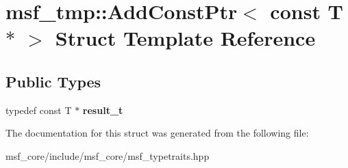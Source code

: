 \hypertarget{structmsf__tmp_1_1AddConstPtr_3_01const_01T_01_5_01_4}{\section{msf\-\_\-tmp\-:\-:Add\-Const\-Ptr$<$ const T $\ast$ $>$ Struct Template Reference}
\label{structmsf__tmp_1_1AddConstPtr_3_01const_01T_01_5_01_4}
}
\subsection*{Public Types}
\begin{DoxyCompactItemize}
\item 
\hypertarget{structmsf__tmp_1_1AddConstPtr_3_01const_01T_01_5_01_4_a8f8af888c4ff5b522236b9cec4b3b2f6}{typedef const T $\ast$ {\bfseries result\-\_\-t}}\label{structmsf__tmp_1_1AddConstPtr_3_01const_01T_01_5_01_4_a8f8af888c4ff5b522236b9cec4b3b2f6}

\end{DoxyCompactItemize}


The documentation for this struct was generated from the following file\-:\begin{DoxyCompactItemize}
\item 
msf\-\_\-core/include/msf\-\_\-core/msf\-\_\-typetraits.\-hpp\end{DoxyCompactItemize}
